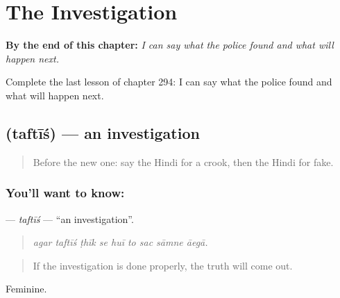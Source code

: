 
\chapter{The Investigation}
\label{ch:hi-the-investigation}

\begin{chapteropening}
\textbf{By the end of this chapter:} \emph{I can say what the police found and what will happen next.}

Complete the last lesson of chapter 294: I can say what the police found and what will happen next.
\end{chapteropening}

\section[\texorpdfstring{\hi{तफ़्तीश} (taftīś)}{तफ़्तीश (taftīś)}]{ (taftīś) — an investigation}

\label{lesson:HI-C294-taftis}



\begin{quote}
Before the new one: say the Hindi for a crook, then the Hindi for fake.
\end{quote}

\subsection*{You'll want to know: }
\textbf{} — \emph{taftīś} — \textquotedblleft{}an investigation\textquotedblright{}.

\begin{quote}
        
\end{quote}

\begin{quote}
\emph{agar taftīś ṭhīk se huī to sac sāmne āegā.}
\end{quote}

\begin{quote}
If the investigation is done properly, the truth will come out.
\end{quote}

Feminine.

